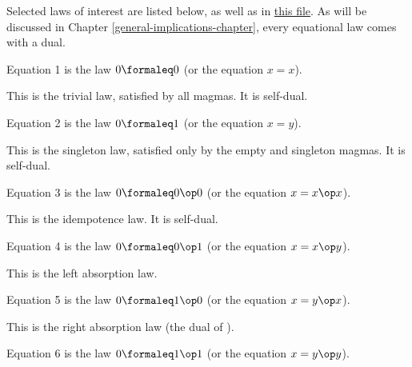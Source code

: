 Selected laws of interest are listed below, as well as in \href{https://github.com/teorth/equational_theories/blob/main/equational_theories/Equations/Basic.lean}{this file}.  As will be discussed in Chapter \ref{general-implications-chapter}, every equational law comes with a dual.

\begin{definition}[Equation 1]\label{eq1}\leanok{}  Equation 1 is the law $0 \formaleq 0$ (or the equation $x=x$).
\end{definition}

This is the trivial law, satisfied by all magmas. It is self-dual.


\begin{definition}[Equation 2]\label{eq2}\leanok{}  Equation 2 is the law $0 \formaleq 1$ (or the equation $x=y$).
\end{definition}

This is the singleton law, satisfied only by the empty and singleton magmas.  It is self-dual.

\begin{definition}[Equation 3]\label{eq3}\leanok{}  Equation 3 is the law $0 \formaleq 0 \op 0$ (or the equation $x = x \op x$).
\end{definition}

This is the idempotence law.  It is self-dual.

\begin{definition}[Equation 4]\label{eq4}\leanok{}  Equation 4 is the law $0 \formaleq 0 \op 1$ (or the equation $x = x \op y$).
\end{definition}

This is the left absorption law.

\begin{definition}[Equation 5]\label{eq5}\leanok{}  Equation 5 is the law $0 \formaleq 1 \op 0$ (or the equation $x = y \op x$).
\end{definition}

This is the right absorption law (the dual of ).

\begin{definition}[Equation 6]\label{eq6}\leanok{}  Equation 6 is the law $0 \formaleq 1 \op 1$ (or the equation $x = y \op y$).
\end{definition}

